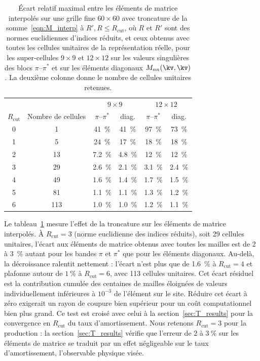 \begin{table}[htbp]
    \centering
    \caption[Erreur de troncature sur les éléments de
    matrice interpolés.]{Écart relatif maximal entre les éléments de
    matrice interpolés sur une grille fine $60\times60$ avec troncature de
    la somme~\eqref{eqn:M_interp} à $R',R \le R_\text{cut}$, où $R$ et $R'$ sont des normes euclidiennes d'indices réduits, et ceux
    obtenus avec toutes les cellules unitaires de la représentation réelle, pour les
    super-cellules $9\times9$ et $12\times12$ sur les valeurs singulières
    des blocs $\pi$--$\pi^*$ et sur les éléments
    diagonaux $M_{nn}(\kv,\kv)$. La deuxième colonne donne le nombre de
    cellules unitaires retenues.}
    \label{tab:rcut_M}
    \begin{tabular}{c c cc cc}
        \hline\hline
        & & \multicolumn{2}{c}{$9\times9$} & \multicolumn{2}{c}{$12\times12$} \\
        $R_\text{cut}$ & Nombre de cellules & $\pi$--$\pi^*$ & diag. & $\pi$--$\pi^*$ & diag. \\
        \hline
        0 & 1   & 41~\%    & 41~\%    & 97~\%    & 73~\%    \\
        1 & 5   & 24~\%    & 17~\%    & 18~\%    & 18~\%    \\
        2 & 13  & 7.2~\% & 4.8~\% & 12~\%    & 12~\%    \\
        3 & 29  & 2.6~\% & 2.1~\% & 3.1~\% & 2.4~\% \\
        4 & 49  & 1.6~\% & 1.4~\% & 1.7~\% & 1.5~\% \\
        5 & 81  & 1.1~\% & 1.1~\% & 1.3~\% & 1.2~\% \\
        6 & 113 & 1.0~\% & 1.0~\% & 1.2~\% & 1.1~\% \\
        \hline\hline
    \end{tabular}
\end{table}
Le tableau~\ref{tab:rcut_M} mesure l'effet de la troncature sur les éléments de matrice interpolés. À $R_\text{cut} =3$ (norme euclidienne des indices réduits), soit 29 cellules unitaires, l'écart aux éléments de matrice obtenus avec toutes les mailles est de 2 à 3~\% autant pour les bandes $\pi$ et $\pi^*$ que pour les éléments diagonaux. Au-delà, la décroissance ralentit nettement : l'écart n'est plus que de 1.6~\% à $R_\text{cut}=4$ et plafonne autour de $1~\%$ à $R_\text{cut}=6$, avec 113 cellules unitaires. Cet écart résiduel est la contribution cumulée des centaines de mailles éloignées de valeurs individuellement inférieures à $10^{-3}$ de l'élément sur le site. Réduire cet écart à zéro exigerait un rayon de coupure bien supérieur pour un coût computationnel bien plus grand. Ce test est croisé avec celui à la section~\ref{sec:T_results} pour la convergence en $R_\text{cut}$ du taux d'amortissement. Nous retenons $R_\text{cut}=3$ pour la production : la section~\ref{sec:T_results} vérifie que l'erreur de $2$ à $3~\%$ sur les éléments de matrice se traduit par un effet négligeable sur le taux d'amortissement, l'observable physique visée.

